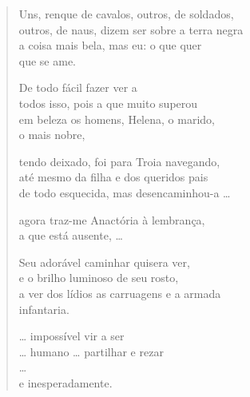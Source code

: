 \begin{verse}
Uns, renque de cavalos, outros, de soldados,\\
outros, de naus, dizem ser sobre a terra negra\\
a coisa mais bela, mas eu: o que quer\\
que se ame.\\

\medskip

De todo fácil fazer ver a\\
todos isso, pois a que muito superou\\			
em beleza os homens, Helena, o marido, \\
o mais nobre,\\

\medskip

tendo deixado, foi para Troia navegando,\\
até mesmo da filha e dos queridos pais\\
de todo esquecida, mas desencaminhou-a \ldots{}\\

\medskip

agora traz-me Anactória à lembrança,\\
a que está ausente, \ldots{}\\

\medskip

Seu adorável caminhar quisera ver,\\
e o brilho luminoso de seu rosto,\\
a ver dos lídios as carruagens e a armada\\
infantaria.\\

\medskip

\ldots{} impossível vir a ser\\
\ldots{} humano \ldots{} partilhar e rezar\\
\ldots{}\\
e inesperadamente.
\end{verse}



\EP[1.3]

